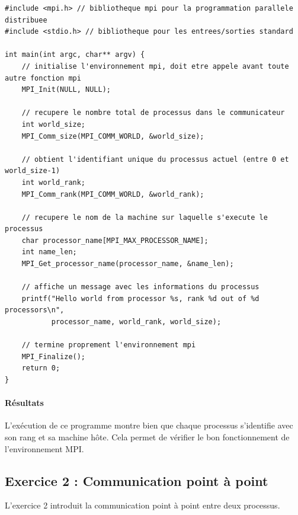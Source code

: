 \documentclass[a4paper,11pt]{article}
\begin{document}
\begin{lstlisting}[caption=Exercice 1 : Hello World avec MPI]
#include <mpi.h> // bibliotheque mpi pour la programmation parallele distribuee
#include <stdio.h> // bibliotheque pour les entrees/sorties standard

int main(int argc, char** argv) {
    // initialise l'environnement mpi, doit etre appele avant toute autre fonction mpi
    MPI_Init(NULL, NULL);

    // recupere le nombre total de processus dans le communicateur
    int world_size;
    MPI_Comm_size(MPI_COMM_WORLD, &world_size);

    // obtient l'identifiant unique du processus actuel (entre 0 et world_size-1)
    int world_rank;
    MPI_Comm_rank(MPI_COMM_WORLD, &world_rank);

    // recupere le nom de la machine sur laquelle s'execute le processus
    char processor_name[MPI_MAX_PROCESSOR_NAME];
    int name_len;
    MPI_Get_processor_name(processor_name, &name_len);

    // affiche un message avec les informations du processus
    printf("Hello world from processor %s, rank %d out of %d processors\n",
           processor_name, world_rank, world_size);

    // termine proprement l'environnement mpi
    MPI_Finalize();
    return 0;
}
\end{lstlisting}

\paragraph{Résultats} L'exécution de ce programme montre bien que chaque processus s'identifie avec son rang et sa machine hôte. Cela permet de vérifier le bon fonctionnement de l'environnement MPI.

\subsection{Exercice 2 : Communication point à point}

L'exercice 2 introduit la communication point à point entre deux processus.
\end{document}
